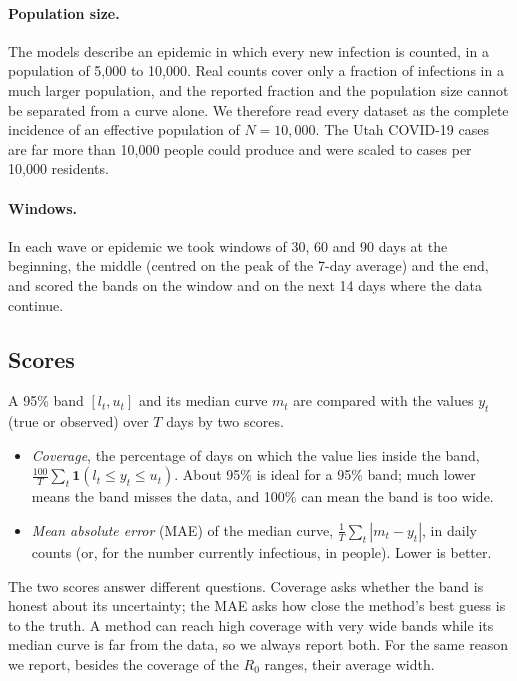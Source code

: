 \documentclass[12pt]{article}
\begin{document}
\paragraph{Population size.} The models describe an epidemic in which every new infection is counted, in
a population of 5,000 to 10,000. Real counts cover only a fraction of infections in a much larger
population, and the reported fraction and the population size cannot be separated from a curve alone.
We therefore read every dataset as the complete incidence of an effective population of $N = 10{,}000$.
The Utah COVID-19 cases are far more than 10,000 people could produce and were scaled to cases per
10,000 residents.

\paragraph{Windows.} In each wave or epidemic we took windows of 30, 60 and 90 days at the beginning, the
middle (centred on the peak of the 7-day average) and the end, and scored the bands on the window and on
the next 14 days where the data continue.

\subsection{Scores}\label{sec:scores}

A 95\% band $[l_t, u_t]$ and its median curve $m_t$ are compared with the values $y_t$ (true or
observed) over $T$ days by two scores.
\begin{itemize}[leftmargin=*]
\item \emph{Coverage}, the percentage of days on which the value lies inside the band,
$\frac{100}{T}\sum_t \mathbf{1}(l_t\le y_t\le u_t)$. About 95\% is ideal for a 95\% band; much lower
means the band misses the data, and 100\% can mean the band is too wide.
\item \emph{Mean absolute error} (MAE) of the median curve, $\frac1T\sum_t |m_t-y_t|$, in daily counts
(or, for the number currently infectious, in people). Lower is better.
\end{itemize}
The two scores answer different questions. Coverage asks whether the band is honest about its
uncertainty; the MAE asks how close the method's best guess is to the truth. A method can reach high
coverage with very wide bands while its median curve is far from the data, so we always report both.
For the same reason we report, besides the coverage of the $R_0$ ranges, their average width.
\end{document}
